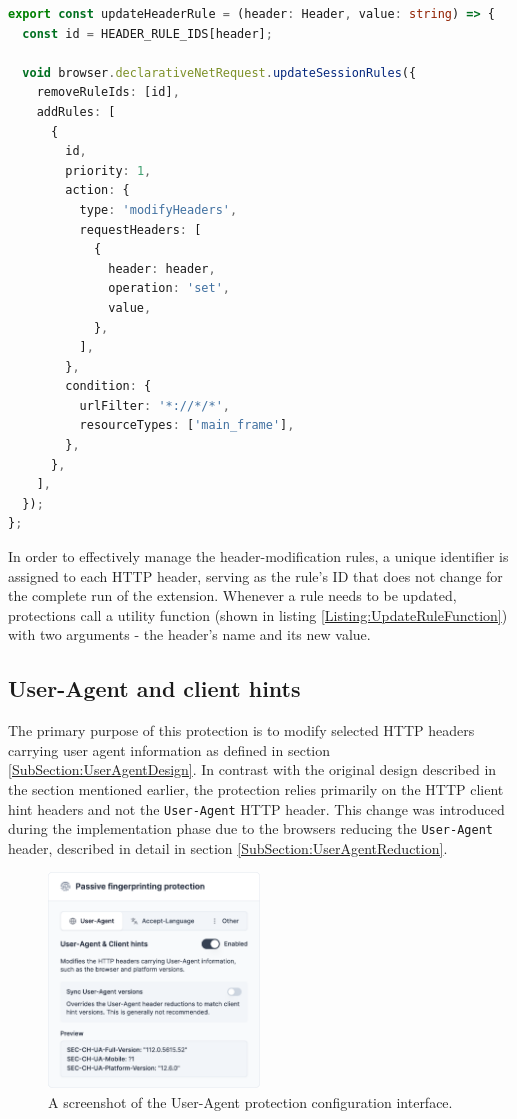 \bigbreak

\begin{lstlisting}[language={TypeScript}, caption={A utility function that removes the old header-modification rule and defines a new one with a new value.}, label={Listing:UpdateRuleFunction}]
export const updateHeaderRule = (header: Header, value: string) => {
  const id = HEADER_RULE_IDS[header];

  void browser.declarativeNetRequest.updateSessionRules({
    removeRuleIds: [id],
    addRules: [
      {
        id,
        priority: 1,
        action: {
          type: 'modifyHeaders',
          requestHeaders: [
            {
              header: header,
              operation: 'set',
              value,
            },
          ],
        },
        condition: {
          urlFilter: '*://*/*',
          resourceTypes: ['main_frame'],
        },
      },
    ],
  });
};

\end{lstlisting}

\medbreak

In order to effectively manage the header-modification rules, a unique identifier is assigned to each HTTP header, serving as the rule's ID that does not change for the complete run of the extension. Whenever a rule needs to be updated, protections call a utility function (shown in listing \ref{Listing:UpdateRuleFunction}) with two arguments - the header's name and its new value.

\subsection{User-Agent and client hints}

The primary purpose of this protection is to modify selected HTTP headers carrying user agent information as defined in section \ref{SubSection:UserAgentDesign}. In contrast with the original design described in the section mentioned earlier, the protection relies primarily on the HTTP client hint headers and not the \texttt{User-Agent} HTTP header. This change was introduced during the implementation phase due to the browsers reducing the \texttt{User-Agent} header, described in detail in section \ref{SubSection:UserAgentReduction}.

\begin{figure}[H]
    \centering
    \includegraphics[width=0.5\textwidth]{obrazky-figures/screenshot-user-agent}
    \caption{A screenshot of the User-Agent protection configuration interface.}
\end{figure}

